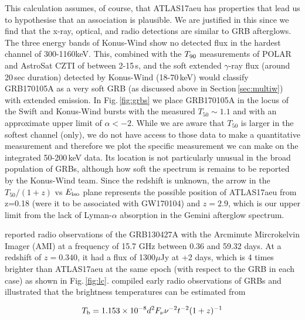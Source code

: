 \documentclass[twocolumn]{aastex61}
\begin{document}
This calculation assumes, of course, that ATLAS17aeu has properties that
lead us to hypothesise that an association is plausible. 
We are justified in this since we find 
that the   x-ray, optical,  and radio detections are similar to GRB afterglows. 
The three energy bands of Konus-Wind show  no detected flux in the hardest channel of 300-1160keV. This, combined with the  $T_{\rm 90}$ measurements of POLAR and AstroSat CZTI of between 2-15\,s, and the soft extended $\gamma$-ray flux  (around 20\,sec duration)
detected by Konus-Wind (18-70\,keV) would classify GRB170105A as a 
very soft GRB (as discussed above in Section\,\ref{sec:multiw}) with extended emission. 
In Fig.\,\ref{fig:grbs} we 
place GRB170105A in the locus of the Swift and Konus-Wind bursts with the measured 
$T_{50}\sim 1.1$ and with an approximate upper limit of $\alpha < -2$.  While we are aware that $T_{50}$ is larger in the 
softest channel (only), we do not have access to those
data to make a quantitative measurement and therefore
we plot the specific measurement we can make on the 
integrated 50-200\,keV data. 
Its location is not particularly unusual in the broad population of GRBs, 
although how soft the spectrum is remains to be reported by the 
Konus-Wind team. Since the redshift is unknown, the arrow in the 
$T_{50}/(1+z)$ vs $E_{\rm iso}$ plane represents the possible position of 
ATLAS17aeu from z=0.18 (were it to be associated with GW170104) and
$z=2.9$, which is our upper limit from the lack of Lyman-$\alpha$ absorption
in the Gemini afterglow spectrum. 

\cite{2014MNRAS.440.2059A} reported radio observations of the GRB130427A with the  Arcminute Mircrokelvin Imager (AMI) at a frequency of
15.7 GHz between 0.36 and 59.32 days. At a redshift of $z=0.340$, 
it had a flux of 1300$\mu$Jy at +2 days, which is 4 times brighter
than ATLAS17aeu at the same epoch (with respect to the GRB in each case)
as shown in Fig.\,\ref{fig:lc}. 
\cite{2014MNRAS.440.2059A} compiled early radio observations of 
GRBs and illustrated that the brightness temperatures can be 
estimated from 

\begin{equation}
T_{\rm b} = 1.153\times10^{-8}d^{2}F_{\nu}\nu^{-2}t^{-2}(1+z)^{-1}
\end{equation}
\end{document}
